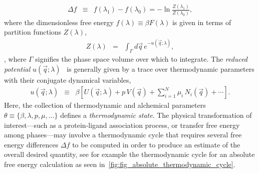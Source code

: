 \documentclass[9pt,bestpractices]{livecoms}
\begin{document}
\begin{eqnarray}
\Delta f &\equiv& f(\lambda_1) - f(\lambda_0) = - \ln \frac{Z(\lambda_1)}{Z(\lambda_0)} , \label{equation:dimensionless-free-energy-difference}
\end{eqnarray}
where the dimensionless free energy $f(\lambda) \equiv \beta F(\lambda)$ is given in terms of partition functions $Z(\lambda)$,
\begin{eqnarray}
Z(\lambda) &=& \int_{\Gamma} d\vec{q} \, e^{-u(\vec{q}; \lambda)} ,
\label{equation:partition-function-definition}
\end{eqnarray}
, where $\Gamma$ signifies the phase space volume over which to integrate. 
The \emph{reduced potential} $u(\vec{q}; \lambda)$~\cite{shirts2008statisticallya} is generally given by a trace over thermodynamic parameters with their conjugate dynamical variables,
\begin{eqnarray}
u(\vec{q};\lambda) &\equiv& \beta \left[ U(\vec{q};\lambda) + p \, V(\vec{q}) + \sum_{i=1}^N \mu_i \, N_i(\vec{q}) + \cdots \right] . \label{equation:reduced-potential}
\end{eqnarray}
Here, the collection of thermodynamic and alchemical parameters $\theta \equiv \{\beta, \lambda, p, \mu, \ldots\}$ defines a \emph{thermodynamic state}.
The physical transformation of interest---such as a protein-ligand association process, or transfer free energy among phases---may involve a thermodynamic cycle that requires several free energy differences $\Delta f$ to be computed in order to produce an estimate of the overall desired quantity, see for example the thermodynamic cycle for an absolute free energy calculation as seen in~\ref{fig:fig_absolute_thermodynamic_cycle}. 
\end{document}
